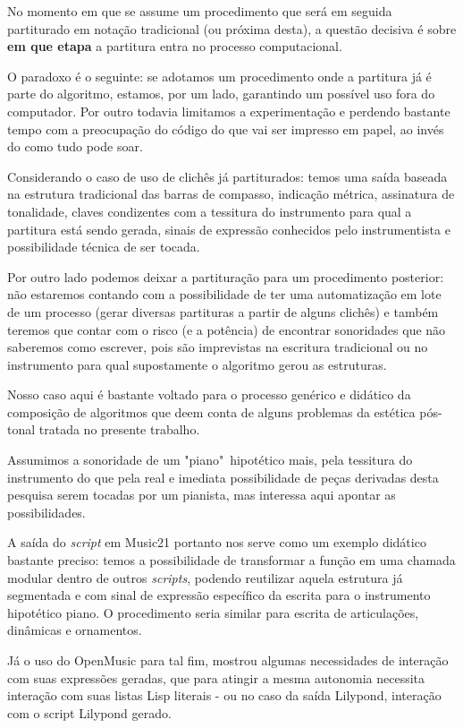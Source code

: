 \documentclass[
	12pt,				%
	openright,			%
	twoside,			%
	a4paper,			%
	english,			%
	french,				%
	spanish,			%
	brazil				%
	]{abntex2}
\begin{document}
No momento em que se assume um procedimento que será em seguida partiturado em notação tradicional (ou próxima desta), a questão decisiva é sobre \textbf{em que etapa} a partitura entra no processo computacional. 

O paradoxo é o seguinte: se adotamos um procedimento onde a partitura já é parte do algoritmo, estamos, por um lado, garantindo um possível uso fora do computador. Por outro todavia limitamos a experimentação e perdendo bastante tempo com a preocupação do código do que vai ser impresso em papel, ao invés do como tudo pode soar. 

Considerando o caso de uso de clichês já partiturados: temos uma saída baseada na estrutura tradicional das barras de compasso, indicação métrica, assinatura de tonalidade, claves condizentes com a tessitura do instrumento para qual a partitura está sendo gerada, sinais de expressão conhecidos pelo instrumentista e possibilidade técnica de ser tocada.

Por outro lado podemos deixar a partituração para um procedimento posterior: não estaremos contando com a possibilidade de ter uma automatização em lote de um processo (gerar diversas partituras a partir de alguns clichês) e também teremos que contar com o risco (e a potência) de encontrar sonoridades que não saberemos como escrever, pois são imprevistas na escritura tradicional ou no instrumento para qual supostamente o algoritmo gerou as estruturas.

Nosso caso aqui é bastante voltado para o processo genérico e didático da composição de algoritmos que deem conta de alguns problemas da estética pós-tonal tratada no presente trabalho. 

Assumimos a sonoridade de um "piano"\ hipotético mais, pela tessitura do instrumento do que pela real e imediata possibilidade de peças derivadas desta pesquisa serem tocadas por um pianista, mas interessa aqui apontar as possibilidades.

A saída do \textit{script} em Music21 portanto nos serve como um exemplo didático bastante preciso: temos a possibilidade de transformar a função em uma chamada modular dentro de outros \textit{scripts}, podendo reutilizar aquela estrutura já segmentada e com sinal de expressão específico da escrita para o instrumento hipotético piano. O procedimento seria similar para escrita de articulações, dinâmicas e ornamentos.

Já o uso do OpenMusic para tal fim, mostrou algumas necessidades de interação com suas expressões geradas, que para atingir a mesma autonomia necessita interação com suas listas Lisp literais - ou no caso da saída Lilypond, interação com o script Lilypond gerado. 
\end{document}
